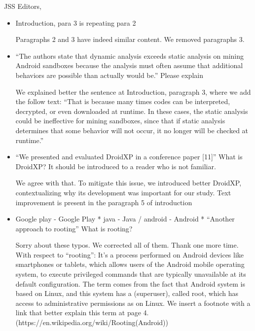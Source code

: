 \documentclass{letter}
\begin{document}
\begin{letter}{JSS Editors,}
\begin{itemize}
\vspace{0.2cm}

\item Introduction, para 3 is repeating para 2


\vspace{0.2cm}

{\color{blue}{\bf Answer.} Paragraphs 2 and 3 have indeed similar content. We removed paragraphs 3.}

\vspace{0.2cm}

\item ``The authors state that dynamic analysis exceeds static analysis on mining Android sandboxes because the
analysis must often assume that additional behaviors are possible than actually would be.''
Please explain


\vspace{0.2cm}

{\color{blue}{\bf Answer.} We explained better the sentence at Introduction, paragraph 3, where we add the follow text: ``That is because many times codes can be interpreted, decrypted, or even downloaded at runtime. In these cases, the static analysis could be ineffective for mining sandboxes, since that if static analysis determines that some behavior will not occur, it no longer will be checked at runtime.''}

\vspace{0.2cm}

\item ``We presented and evaluated DroidXP in a conference paper [11]''
What is DroidXP? It should be introduced to a reader who is not familiar.


\vspace{0.2cm}

{\color{blue}{\bf Answer.} We agree with that. To mitigate this issue, we introduced better DroidXP, contextualizing why its development was important for our study. Text improvement is present in the paragraph 5 of introduction}

\vspace{0.2cm}

\item Google play - Google Play
* java - Java / android - Android
* ``Another approach to rooting''
What is rooting?


\vspace{0.2cm}

{\color{blue}{\bf Answer.} Sorry about these typos. We corrected all of them. Thank one more time. With respect to ``rooting'': It's a process performed on Android devices like smartphones or tablets, which allows users of the Android mobile operating system, to execute privileged commands that are typically unavailable at its default configuration. The term comes from the fact that Android system is based on Linux, and this system has a (superuser), called root, which has access to administrative permissions as on Linux. We insert a footnote with a link that better explain this term at page 4.\newline
(https://en.wikipedia.org/wiki/Rooting(Android))
}


\end{itemize}
\end{letter}
\end{document}
